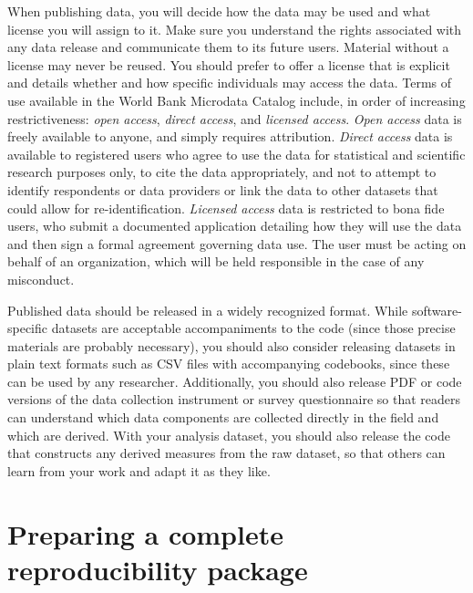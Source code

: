 When publishing data,
you will decide how the data may be used and what license you will assign to it.
Make sure you understand the rights associated with any data release
and communicate them to its future users.
Material without a license may never be reused.
You should prefer to offer a license that is explicit
and details whether and how specific individuals may access the data.
Terms of use available in the World Bank Microdata Catalog include,
in order of increasing restrictiveness:
\textit{open access}, \textit{direct access}, and \textit{licensed access}.
\textit{Open access} data is freely available to anyone, and simply requires attribution.
\textit{Direct access} data is available to registered users who agree
to use the data for statistical and scientific research purposes only,
to cite the data appropriately,
and not to attempt to identify respondents or data providers
or link the data to other datasets that could allow for re-identification.
\textit{Licensed access} data is restricted to bona fide users,
who submit a documented application detailing
how they will use the data and then sign a formal agreement governing data use.
The user must be acting on behalf of an organization,
which will be held responsible in the case of any misconduct.

Published data should be released in a widely recognized format.
While software-specific datasets are acceptable accompaniments to the code
(since those precise materials are probably necessary),
you should also consider releasing datasets in plain text formats
such as CSV files with accompanying codebooks,
since these can be used by any researcher.
Additionally, you should also release PDF or code versions of
the data collection instrument or survey questionnaire
so that readers can understand which data components are
collected directly in the field and which are derived.
With your analysis dataset,
you should also release the code
that constructs any derived measures
from the raw dataset,
so that others can learn from your work and adapt it as they like.

\section{Preparing a complete reproducibility package}


